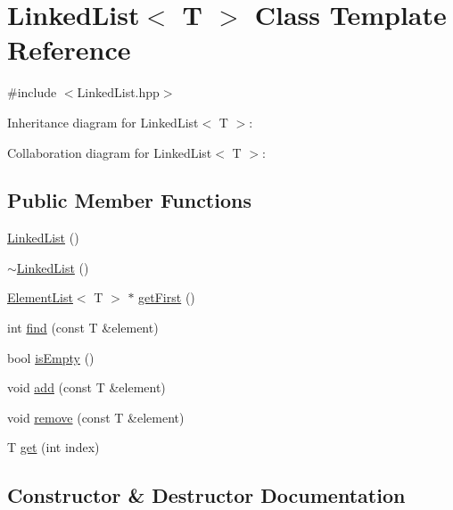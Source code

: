 \hypertarget{class_linked_list}{}\section{Linked\+List$<$ T $>$ Class Template Reference}
\label{class_linked_list}


{\ttfamily \#include $<$Linked\+List.\+hpp$>$}



Inheritance diagram for Linked\+List$<$ T $>$\+:


Collaboration diagram for Linked\+List$<$ T $>$\+:
\subsection*{Public Member Functions}
\begin{DoxyCompactItemize}
\item 
\mbox{\hyperlink{class_linked_list_a3c20fcfec867e867f541061a09fc640c}{Linked\+List}} ()
\item 
\mbox{\hyperlink{class_linked_list_a7c37609df3b83bc4eb0281b852f93fd7}{$\sim$\+Linked\+List}} ()
\item 
\mbox{\hyperlink{struct_element_list}{Element\+List}}$<$ T $>$ $\ast$ \mbox{\hyperlink{class_linked_list_a4ea79e8ffd6bb92736df640d86a04705}{get\+First}} ()
\item 
int \mbox{\hyperlink{class_linked_list_a6f359c1f8a9fded8c89d00a97c4287fb}{find}} (const T \&element)
\item 
bool \mbox{\hyperlink{class_linked_list_a7ecbb28e82117a680839ed0dc28ebdce}{is\+Empty}} ()
\item 
void \mbox{\hyperlink{class_linked_list_a0083b3395050b2e601388bc7872a03d8}{add}} (const T \&element)
\item 
void \mbox{\hyperlink{class_linked_list_a464f248b57c763a253f9bba018d1a857}{remove}} (const T \&element)
\item 
T \mbox{\hyperlink{class_linked_list_a25079ed9b408efad63a1522c818d8705}{get}} (int index)
\end{DoxyCompactItemize}


\subsection{Constructor \& Destructor Documentation}
\mbox{\label{class_linked_list_a3c20fcfec867e867f541061a09fc640c}} 
